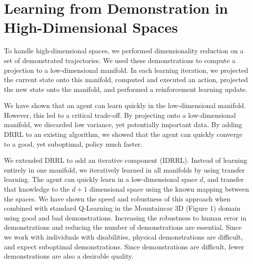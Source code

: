 \documentclass[letterpaper]{article}
\begin{document}


\section{Learning from Demonstration in High-Dimensional Spaces}
\label{Dimensionality Reduced Reinforcement Learning}

To handle high-dimensional spaces, we performed dimensionality reduction on a set of demonstrated trajectories. We used these demonstrations to compute a projection to a low-dimensional manifold. In each learning iteration, we projected the current state onto this manifold, computed and executed an action, projected the new state onto the manifold, and performed a reinforcement learning update.

We have shown that an agent can learn quickly in the low-dimensional manifold. However, this led to a critical trade-off. By projecting onto a low-dimensional manifold, we discarded low variance, yet potentially important data. By adding DRRL to an existing algorithm, we showed that the agent can quickly converge to a good, yet suboptimal, policy much faster. 

We extended DRRL to add an iterative component (IDRRL). Instead of learning entirely in one manifold, we iteratively learned in all manifolds by using transfer learning. The agent can quickly learn in a low-dimensional space $d$, and transfer that knowledge to the $d+1$ dimensional space using the known mapping between the spaces. We have shown the speed and robustness of this approach when combined with standard Q-Learning in the Mountaincar 3D (Figure 1) domain using good and bad demonstrations. Increasing the robustness to human error in demonstrations and reducing the number of demonstrations are essential. Since we work with individuals with disabilities, physical demonstrations are difficult, and expect suboptimal demonstrations. Since demonstrations are difficult, fewer demonstrations are also a desirable quality.
\end{document}
